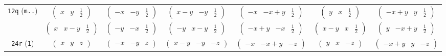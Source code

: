 \documentclass[fleqn,9pt,landscape]{jsarticle}
\begin{document}
\begin{center}
\begin{longtable}{ccccccc}
{\tt 12q} ({\tt m..}) & $ \begin{pmatrix} x & y & \frac{1}{2} \end{pmatrix} $ & $ \begin{pmatrix} - x & - y & \frac{1}{2} \end{pmatrix} $ & $ \begin{pmatrix} x - y & - y & \frac{1}{2} \end{pmatrix} $ & $ \begin{pmatrix} - x & - x + y & \frac{1}{2} \end{pmatrix} $ & $ \begin{pmatrix} y & x & \frac{1}{2} \end{pmatrix} $ & $ \begin{pmatrix} - x + y & y & \frac{1}{2} \end{pmatrix} $ \\
& $ \begin{pmatrix} x & x - y & \frac{1}{2} \end{pmatrix} $ & $ \begin{pmatrix} - y & - x & \frac{1}{2} \end{pmatrix} $ & $ \begin{pmatrix} - y & x - y & \frac{1}{2} \end{pmatrix} $ & $ \begin{pmatrix} - x + y & - x & \frac{1}{2} \end{pmatrix} $ & $ \begin{pmatrix} x - y & x & \frac{1}{2} \end{pmatrix} $ & $ \begin{pmatrix} y & - x + y & \frac{1}{2} \end{pmatrix} $ \\ \hline
{\tt 24r} ({\tt 1}) & $ \begin{pmatrix} x & y & z \end{pmatrix} $ & $ \begin{pmatrix} - x & - y & z \end{pmatrix} $ & $ \begin{pmatrix} x - y & - y & - z \end{pmatrix} $ & $ \begin{pmatrix} - x & - x + y & - z \end{pmatrix} $ & $ \begin{pmatrix} y & x & - z \end{pmatrix} $ & $ \begin{pmatrix} - x + y & y & - z \end{pmatrix} $ \\

\end{longtable}
\end{center}
\end{document}
